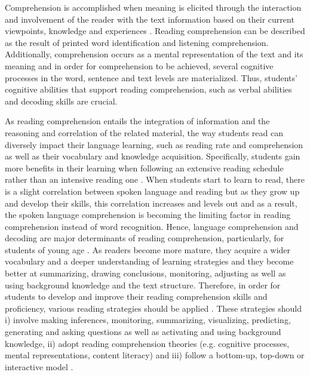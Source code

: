 \documentclass[english]{textolivre}
\begin{document}
Comprehension is accomplished when meaning is elicited through the interaction and involvement of the reader with the text information based on their current viewpoints, knowledge and experiences \cite{mcnamara_chapter_2009}. Reading comprehension can be described as the result of printed word identification and listening comprehension. Additionally, comprehension occurs as a mental representation of the text and its meaning and in order for comprehension to be achieved, several cognitive processes in the word, sentence and text levels are materialized. Thus, students’ cognitive abilities that support reading comprehension, such as verbal abilities and decoding skills are crucial.

As reading comprehension entails the integration of information and the reasoning and correlation of the related material, the way students read can diversely impact their language learning, such as reading rate and comprehension as well as their vocabulary and knowledge acquisition. Specifically, students gain more benefits in their learning when following an extensive reading schedule rather than an intensive reading one \cite{blachowicz_reading_2017}. When students start to learn to read, there is a slight correlation between spoken language and reading but as they grow up and develop their skills, this correlation increases and levels out and as a result, the spoken language comprehension is becoming the limiting factor in reading comprehension instead of word recognition. Hence, language comprehension and decoding are major determinants of reading comprehension, particularly, for students of young age \cite{hjetland_pathways_2019}. As readers become more mature, they acquire a wider vocabulary and a deeper understanding of learning strategies and they become better at summarizing, drawing conclusions, monitoring, adjusting as well as using background knowledge and the text structure. Therefore, in order for students to develop and improve their reading comprehension skills and proficiency, various reading strategies should be applied \cite{brookbank1999improving}. These strategies should i) involve making inferences, monitoring, summarizing, visualizing, predicting, generating and asking questions as well as activating and using background knowledge, ii) adopt reading comprehension theories (e.g. cognitive processes, mental representations, content literacy) and iii) follow a bottom-up, top-down or interactive model \cite{pourhosein_gilakjani_how_2016}.
\end{document}
